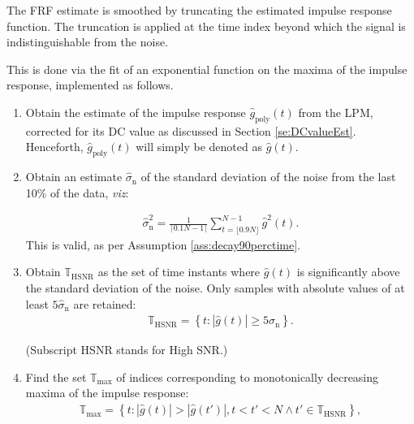 The \gls{FRF} estimate is smoothed by truncating the estimated impulse response function. The truncation is applied at the time index beyond which the signal is indistinguishable from the noise. 

This is done via the fit of an exponential function on the maxima of the impulse response, implemented as follows.

\begin{enumerate}
\item Obtain the estimate of the impulse response $\hat g_\mathrm{poly}(t)$ from the LPM, corrected for its DC value as discussed in Section \ref{se:DCvalueEst}. Henceforth, $\hat g_\mathrm{poly}(t)$ will simply be denoted as $\hat g(t)$. %

\item Obtain an estimate $\hat \sigma_\mathrm{n}$ of the standard deviation of the noise from the last 10\% of the data, \emph{viz}:

\begin{align}
\hat \sigma^2_\mathrm{n}=\frac{1}{\lceil0.1N - 1\rceil}\sum_{t=\lfloor0.9N\rfloor}^{N-1}\hat g^2(t).
\end{align}
This is valid, as per Assumption \ref{ass:decay90perctime}.


\item Obtain $\mathbb{T}_\mathrm{HSNR}$ as the set of time instants where $\hat g(t)$ is significantly above the standard deviation of the noise. Only samples with absolute values of at least $5\hat\sigma_\mathrm{n}$ are retained: %
\begin{align}
\mathbb{T}_\mathrm{HSNR} = \left\{
t:|\hat g(t)|\geqslant 5\hat\sigma_\mathrm{n}
\right\}.
\end{align}

\noindent
(Subscript HSNR stands for High \gls{SNR}.)


\item Find the set $\mathbb{T}_\mathrm{max}$ of indices corresponding to monotonically decreasing maxima of the impulse response:
\begin{align}\label{eq:TmaxDef}
\mathbb{T}_\mathrm{max} = \left\{
t: \left| \hat g(t)\right|>
\left|\hat g(t')\right|,
t < t' < N \land t'\in\mathbb{T}_\mathrm{HSNR}
\right\},
\end{align}


\end{enumerate}
